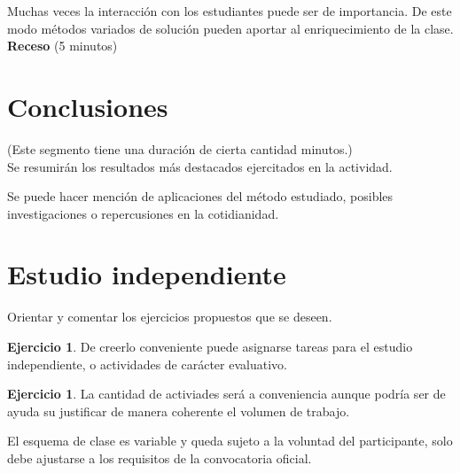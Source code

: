 \documentclass[a4paper,10pt,twocolumn]{article}
\theoremstyle{theorem}
\theoremstyle{definition}
\newtheorem{ejer}[thm]{Ejercicio}
\theoremstyle{remark}
\begin{document}
Muchas veces la interacción con los estudiantes puede ser de importancia. De este modo métodos variados de solución pueden aportar al enriquecimiento de la clase.\\

\textbf{Receso} (5 minutos)


\section{Conclusiones} \label{sec:conc}

(Este segmento tiene una duración de cierta cantidad minutos.)\\
 
Se resumirán los resultados más destacados ejercitados en la actividad.

Se puede hacer mención de aplicaciones del método estudiado, posibles investigaciones o repercusiones en la cotidianidad.


\section{Estudio independiente} \label{independ}

Orientar y comentar los ejercicios propuestos que se deseen.

\begin{ejer}
	De creerlo conveniente puede asignarse tareas para el estudio independiente, o actividades de carácter evaluativo. 
\end{ejer}

\begin{ejer}
	 La cantidad de activiades será a conveniencia aunque podría ser de ayuda su justificar de manera coherente el volumen de trabajo.
\end{ejer}

El esquema de clase es variable y queda sujeto a la voluntad del participante, solo debe ajustarse a los requisitos de la convocatoria oficial.
\end{document}

